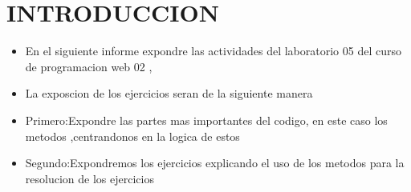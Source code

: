 \documentclass{article}
\begin{document}
	\section{INTRODUCCION}
	\begin{itemize}		
		\item En el siguiente informe expondre las actividades del laboratorio 05 del curso de programacion web 02 ,
		\item La exposcion de los ejercicios seran de la siguiente manera
		\item Primero:Expondre las partes mas importantes del codigo, en este caso los metodos ,centrandonos en la logica de estos
		\item Segundo:Expondremos los ejercicios explicando el uso de los metodos para la resolucion de los ejercicios
	\end{itemize}
\end{document}
